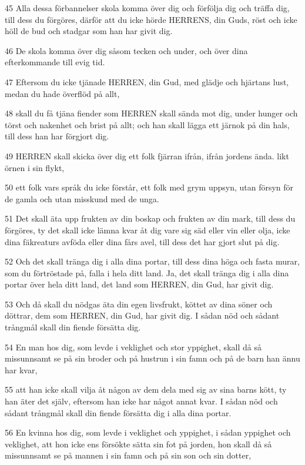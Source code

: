 \par 45 Alla dessa förbannelser skola komma över dig och förfölja dig och träffa dig, till dess du förgöres, därför att du icke hörde HERRENS, din Guds, röst och icke höll de bud och stadgar som han har givit dig.
\par 46 De skola komma över dig såsom tecken och under, och över dina efterkommande till evig tid.
\par 47 Eftersom du icke tjänade HERREN, din Gud, med glädje och hjärtans lust, medan du hade överflöd på allt,
\par 48 skall du få tjäna fiender som HERREN skall sända mot dig, under hunger och törst och nakenhet och brist på allt; och han skall lägga ett järnok på din hals, till dess han har förgjort dig.
\par 49 HERREN skall skicka över dig ett folk fjärran ifrån, ifrån jordens ända. likt örnen i sin flykt,
\par 50 ett folk vars språk du icke förstår, ett folk med grym uppsyn, utan försyn för de gamla och utan misskund med de unga.
\par 51 Det skall äta upp frukten av din boskap och frukten av din mark, till dess du förgöres, ty det skall icke lämna kvar åt dig vare sig säd eller vin eller olja, icke dina fäkreaturs avföda eller dina fårs avel, till dess det har gjort slut på dig.
\par 52 Och det skall tränga dig i alla dina portar, till dess dina höga och fasta murar, som du förtröstade på, falla i hela ditt land. Ja, det skall tränga dig i alla dina portar över hela ditt land, det land som HERREN, din Gud, har givit dig.
\par 53 Och då skall du nödgas äta din egen livsfrukt, köttet av dina söner och döttrar, dem som HERREN, din Gud, har givit dig. I sådan nöd och sådant trångmål skall din fiende försätta dig.
\par 54 En man hos dig, som levde i veklighet och stor yppighet, skall då så missunnsamt se på sin broder och på hustrun i sin famn och på de barn han ännu har kvar,
\par 55 att han icke skall vilja åt någon av dem dela med sig av sina barns kött, ty han äter det själv, eftersom han icke har något annat kvar. I sådan nöd och sådant trångmål skall din fiende försätta dig i alla dina portar.
\par 56 En kvinna hos dig, som levde i veklighet och yppighet, i sådan yppighet och veklighet, att hon icke ens försökte sätta sin fot på jorden, hon skall då så missunnsamt se på mannen i sin famn och på sin son och sin dotter,
